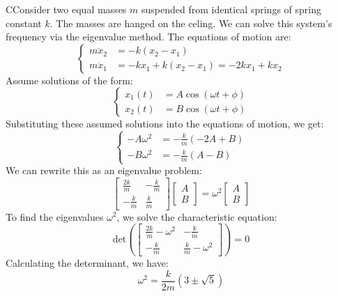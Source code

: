 \documentclass[11pt]{report}
\begin{document}
\begin{example}
    CConsider two equal masses $m$ suspended from identical springs of spring constant $k$. The masses are hanged on the celing. We can solve this system's frequency via the eigenvalue method. The equations of motion are:
    $$
        \begin{cases}
            m\ddot{x}_2 &= -k(x_2 - x_1)\\
            m\ddot{x}_1 &= -k x_1 + k(x_2 - x_1) = -2k x_1 + k x_2
        \end{cases}
    $$
    Assume solutions of the form:
    $$        
    \begin{cases}
            x_1(t) &= A \cos(\omega t + \phi) \\
            x_2(t) &= B \cos(\omega t + \phi)
        \end{cases}
    $$
    Substituting these assumed solutions into the equations of motion, we get:
    $$
        \begin{cases}
            -A \omega^2 &= -\frac{k}{m}(-2A + B) \\
            -B \omega^2 &= -\frac{k}{m}(A - B)
        \end{cases}
    $$
    We can rewrite this as an eigenvalue problem:
    $$
        \begin{bmatrix}
            \frac{2k}{m} & -\frac{k}{m} \\
            -\frac{k}{m} & \frac{k}{m}
        \end{bmatrix}
        \begin{bmatrix}
            A \\ B
        \end{bmatrix}
        = \omega^2
        \begin{bmatrix}
            A \\ B
        \end{bmatrix}
    $$
    To find the eigenvalues \( \omega^2 \), we solve the characteristic equation:
    $$
        \text{det}\left(\begin{bmatrix}
            \frac{2k}{m} - \omega^2 & -\frac{k}{m} \\
            -\frac{k}{m} & \frac{k}{m} - \omega^2
        \end{bmatrix}\right) = 0
    $$
    Calculating the determinant, we have:
    $$
        \omega^2 = \frac{k}{2m}(3\pm \sqrt{5})
    $$
\end{example}
\end{document}
